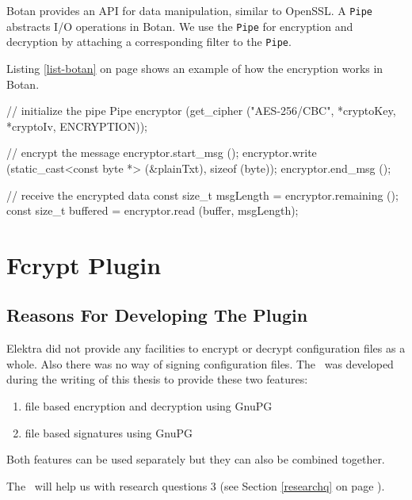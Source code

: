 Botan provides an API for data manipulation, similar to OpenSSL.
A \texttt{Pipe} abstracts I/O operations in Botan.
We use the \texttt{Pipe} for encryption and decryption by attaching a corresponding filter to the \texttt{Pipe}. 

Listing \ref{list-botan} on page \pageref{list-botan} shows an example of how the encryption works in Botan.

\begin{code}[label=list-botan,language=C++,caption={Encryption in the Botan crypto plugin variant}]
// initialize the pipe
Pipe encryptor (get_cipher ("AES-256/CBC", 
	*cryptoKey, *cryptoIv, ENCRYPTION));

// encrypt the message
encryptor.start_msg ();
encryptor.write (static_cast<const byte *> (&plainTxt), 
	sizeof (byte));
encryptor.end_msg ();

// receive the encrypted data
const size_t msgLength = encryptor.remaining ();
const size_t buffered = encryptor.read (buffer, msgLength);
\end{code}


\section{Fcrypt Plugin}
\label{fcrypt-plugin}

\subsection{Reasons For Developing The Plugin}

Elektra did not provide any facilities to encrypt or decrypt configuration files as a whole.
Also there was no way of signing configuration files.
The \fcrypt ~was developed during the writing of this thesis to provide these two features:
\begin{enumerate}
\item file based encryption and decryption using GnuPG
\item file based signatures using GnuPG
\end{enumerate}

Both features can be used separately but they can also be combined together.

The \fcrypt ~will help us with research questions 3 (see Section \ref{researchq} on page \pageref{researchq}).

